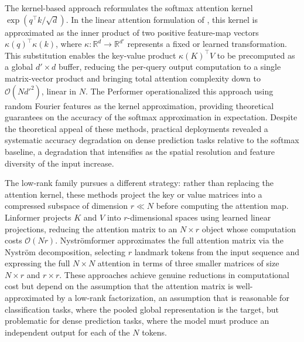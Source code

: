 The kernel-based approach reformulates the softmax attention kernel $\exp(q^\top k / \sqrt{d})$. In the linear attention formulation of \cite{Katharopoulos2020Linear}, this kernel is approximated as the inner product of two positive feature-map vectors $\kappa(q)^\top \kappa(k)$, where $\kappa: \mathbb{R}^d \to \mathbb{R}^{d'}$ represents a fixed or learned transformation. This substitution enables the key-value product $\kappa(K)^\top V$ to be precomputed as a global $d' \times d$ buffer, reducing the per-query output computation to a single matrix-vector product and bringing total attention complexity down to $\mathcal{O}(N {d'}^2)$, linear in $N$. The Performer \cite{Choromanski2021Performer} operationalized this approach using random Fourier features as the kernel approximation, providing theoretical guarantees on the accuracy of the softmax approximation in expectation. Despite the theoretical appeal of these methods, practical deployments revealed a systematic accuracy degradation on dense prediction tasks relative to the softmax baseline, a degradation that intensifies as the spatial resolution and feature diversity of the input increase.

The low-rank family pursues a different strategy: rather than replacing the attention kernel, these methods project the key or value matrices into a compressed subspace of dimension $r \ll N$ before computing the attention map. Linformer \cite{Wang2020Linformer} projects $K$ and $V$ into $r$-dimensional spaces using learned linear projections, reducing the attention matrix to an $N \times r$ object whose computation costs $\mathcal{O}(Nr)$. Nystr\"{o}mformer \cite{Xiong2021Nystromformer} approximates the full attention matrix via the Nystr\"{o}m decomposition, selecting $r$ landmark tokens from the input sequence and expressing the full $N \times N$ attention in terms of three smaller matrices of size $N \times r$ and $r \times r$. These approaches achieve genuine reductions in computational cost but depend on the assumption that the attention matrix is well-approximated by a low-rank factorization, an assumption that is reasonable for classification tasks, where the pooled global representation is the target, but problematic for dense prediction tasks, where the model must produce an independent output for each of the $N$ tokens.

